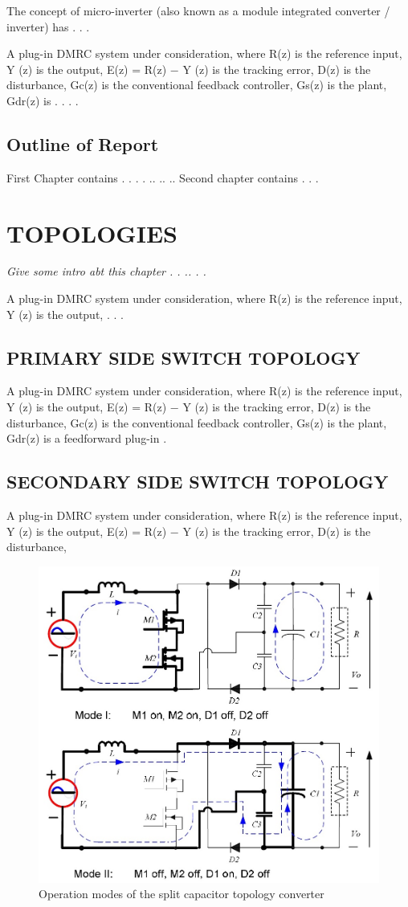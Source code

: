 The concept of micro-inverter (also known as a module integrated converter / inverter) has . . . 

A plug-in DMRC system under consideration, where R(z) is the reference input, Y (z) is the output, E(z) = R(z) − Y (z) is the tracking error, D(z) is the disturbance, Gc(z) is the conventional feedback controller, Gs(z) is the plant, Gdr(z) is . . . . 

\section{Outline of Report}

First Chapter contains  . . . . .. .. .. Second chapter contains . . .



\chapter{TOPOLOGIES}			%

{\em Give some intro abt this chapter . . .. .  .

A plug-in DMRC system under consideration, where R(z) is the reference input, Y (z) is the output, . . .  }

\section{PRIMARY SIDE SWITCH TOPOLOGY}

A plug-in DMRC system under consideration, where R(z) is the reference input, Y (z) is the output, E(z) = R(z) − Y (z) is the tracking error, D(z) is the disturbance,
Gc(z) is the conventional feedback controller, Gs(z) is the plant, Gdr(z) is a feedforward plug-in \cite{ref3}.


\section{SECONDARY SIDE SWITCH TOPOLOGY}

A plug-in DMRC system under consideration, where R(z) is the reference input, Y (z) is the output, E(z) = R(z) − Y (z) is the tracking error, D(z) is the disturbance,

\begin{figure}[h]
\begin{center}
\includegraphics[width = 8 cm]{5.jpg}
\caption{Operation modes of the split capacitor topology converter}
\end{center}
\end{figure}

